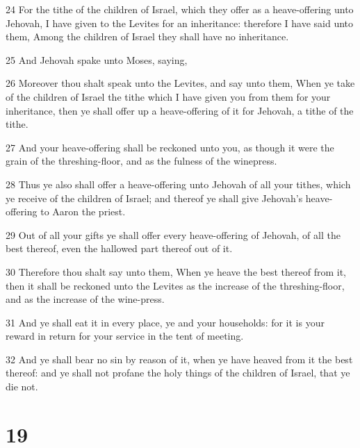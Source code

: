 \par 24 For the tithe of the children of Israel, which they offer as a heave-offering unto Jehovah, I have given to the Levites for an inheritance: therefore I have said unto them, Among the children of Israel they shall have no inheritance.
\par 25 And Jehovah spake unto Moses, saying,
\par 26 Moreover thou shalt speak unto the Levites, and say unto them, When ye take of the children of Israel the tithe which I have given you from them for your inheritance, then ye shall offer up a heave-offering of it for Jehovah, a tithe of the tithe.
\par 27 And your heave-offering shall be reckoned unto you, as though it were the grain of the threshing-floor, and as the fulness of the winepress.
\par 28 Thus ye also shall offer a heave-offering unto Jehovah of all your tithes, which ye receive of the children of Israel; and thereof ye shall give Jehovah's heave-offering to Aaron the priest.
\par 29 Out of all your gifts ye shall offer every heave-offering of Jehovah, of all the best thereof, even the hallowed part thereof out of it.
\par 30 Therefore thou shalt say unto them, When ye heave the best thereof from it, then it shall be reckoned unto the Levites as the increase of the threshing-floor, and as the increase of the wine-press.
\par 31 And ye shall eat it in every place, ye and your households: for it is your reward in return for your service in the tent of meeting.
\par 32 And ye shall bear no sin by reason of it, when ye have heaved from it the best thereof: and ye shall not profane the holy things of the children of Israel, that ye die not.

\chapter{19}

